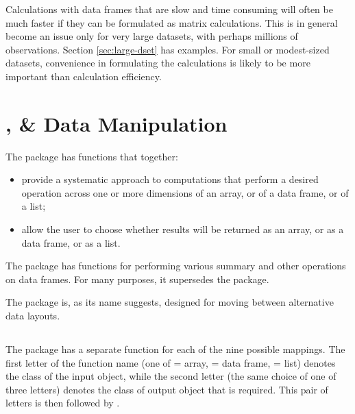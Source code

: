 Calculations with data frames that are slow and time consuming will
often be much faster if they can be formulated as matrix calculations.
This is in general become an issue only for very large datasets,
with perhaps millions of observations. Section \ref{sec:large-dset}
has examples.  For small or modest-sized datasets, convenience in
formulating the calculations is likely to be more important than
calculation efficiency.


\section{,   \&   Data Manipulation}\label{sec:plyr}

The  package has functions that together:
\begin{itemize}
\item provide a systematic approach to computations that perform a
  desired operation across one or more dimensions of an array, or
  of a data frame, or of a list;
\item allow the user to choose whether results will be returned as an
array, or as a data frame, or as a list.
\end{itemize}

The  package has functions for performing various summary
and other operations on data frames. For many purposes, it supersedes
the  package.

The  package is, as its name suggests, designed for
moving between alternative data layouts.

\subsection{ }

The  package has a separate function for each of the nine
possible mappings.  The first letter of the function name (one of
 = array,  = data frame,  = list) denotes the
class of the input object, while the second letter (the same choice of
one of three letters) denotes the class of output object that is
required.  This pair of letters is then followed by .

